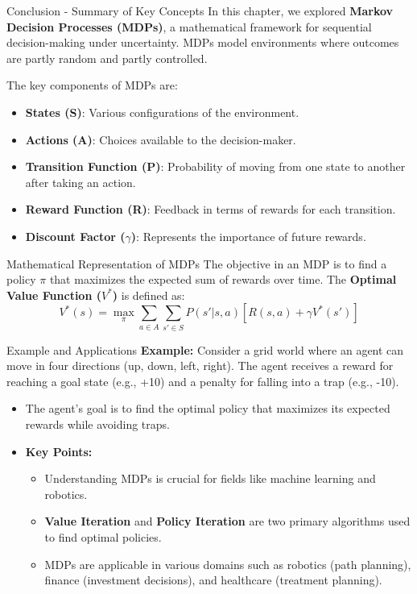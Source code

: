 \documentclass[aspectratio=169]{beamer}
\begin{document}
\begin{frame}[fragile]{Conclusion - Summary of Key Concepts}
    In this chapter, we explored \textbf{Markov Decision Processes (MDPs)}, a mathematical framework for sequential decision-making under uncertainty. MDPs model environments where outcomes are partly random and partly controlled.
    
    The key components of MDPs are:
    \begin{itemize}
        \item \textbf{States (S)}: Various configurations of the environment.
        \item \textbf{Actions (A)}: Choices available to the decision-maker.
        \item \textbf{Transition Function (P)}: Probability of moving from one state to another after taking an action.
        \item \textbf{Reward Function (R)}: Feedback in terms of rewards for each transition.
        \item \textbf{Discount Factor ($\gamma$)}: Represents the importance of future rewards.
    \end{itemize}
\end{frame}

\begin{frame}[fragile]{Mathematical Representation of MDPs}
    The objective in an MDP is to find a policy $\pi$ that maximizes the expected sum of rewards over time. The \textbf{Optimal Value Function ($V^*$)} is defined as:
    \begin{equation}
    V^*(s) = \max_{\pi} \sum_{a \in A} \sum_{s' \in S} P(s'|s, a) [R(s, a) + \gamma V^*(s')]
    \end{equation}
\end{frame}

\begin{frame}[fragile]{Example and Applications}
    \textbf{Example:} Consider a grid world where an agent can move in four directions (up, down, left, right). The agent receives a reward for reaching a goal state (e.g., +10) and a penalty for falling into a trap (e.g., -10). 

    \begin{itemize}
        \item The agent’s goal is to find the optimal policy that maximizes its expected rewards while avoiding traps.
        \item \textbf{Key Points:}
        \begin{itemize}
            \item Understanding MDPs is crucial for fields like machine learning and robotics.
            \item \textbf{Value Iteration} and \textbf{Policy Iteration} are two primary algorithms used to find optimal policies.
            \item MDPs are applicable in various domains such as robotics (path planning), finance (investment decisions), and healthcare (treatment planning).
        \end{itemize}
    \end{itemize}
\end{frame}
\end{document}
